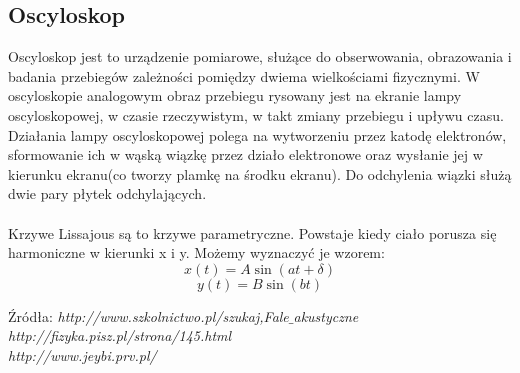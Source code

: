 \documentclass{article}
\begin{document}
\subsection{Oscyloskop}
Oscyloskop jest to urządzenie pomiarowe, służące do obserwowania, obrazowania i badania przebiegów zależności pomiędzy dwiema wielkościami fizycznymi. W oscyloskopie analogowym obraz przebiegu rysowany jest na ekranie lampy oscyloskopowej, w czasie rzeczywistym, w takt zmiany przebiegu i upływu czasu. Działania lampy oscyloskopowej polega na wytworzeniu przez katodę elektronów, sformowanie ich w wąską wiązkę przez działo elektronowe oraz wysłanie jej w kierunku ekranu(co tworzy plamkę na środku ekranu). Do odchylenia wiązki służą dwie pary płytek odchylających.\\\\
Krzywe Lissajous są to krzywe parametryczne. Powstaje kiedy ciało porusza się harmoniczne w kierunki x i y. Możemy wyznaczyć je wzorem:
$$x(t) = A\sin (at + \delta)$$
$$y(t) = B\sin (bt)$$
\begin{flushright}
\begin{scriptsize}
Źródła: \textit{http://www.szkolnictwo.pl/szukaj,Fale$\_$akustyczne} \\
\textit{http://fizyka.pisz.pl/strona/145.html}\\
\textit{http://www.jeybi.prv.pl/}\\
\end{scriptsize}
\end{flushright}
\end{document}
